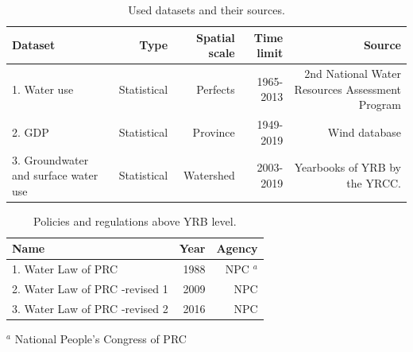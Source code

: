 \documentclass[9pt,twoside,lineno]{pnas-new}
\begin{document}







\begin{table}\centering
    \caption{Used datasets and their sources.}
    
    \begin{tabular}{lrrrr}
    Dataset & Type & Spatial scale & Time limit & Source \\
    \midrule
    1. Water use & Statistical & Perfects & 1965-2013 & 2nd National Water Resources Assessment Program \\
    2. GDP & Statistical & Province & 1949-2019 & Wind database \\
    3. Groundwater and surface water use & Statistical & Watershed & 2003-2019 & Yearbooks of YRB by the YRCC. \\
    \bottomrule
    \end{tabular}
\end{table}


\begin{table}\centering
    \caption{Policies and regulations above YRB level.}
    
    \begin{tabular}{lrr}
    Name & Year & Agency \\
    \midrule
    1. Water Law of PRC & 1988 & NPC $^a$ \\
    2. Water Law of PRC -revised 1 & 2009 & NPC \\
    3. Water Law of PRC -revised 2 & 2016 & NPC \\
    \bottomrule
    \end{tabular}

    \footnotesize{$^a$ National People's Congress of PRC}
\end{table}
\end{document}

